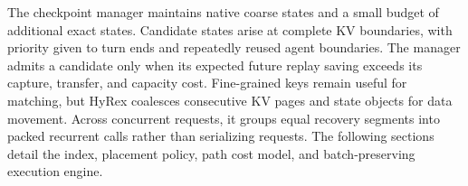\documentclass[sigconf,anonymous,review]{acmart}
\begin{document}
The checkpoint manager maintains native coarse states and a small budget of
additional exact states.  Candidate states arise at complete KV boundaries,
with priority given to turn ends and repeatedly reused agent boundaries.  The
manager admits a candidate only when its expected future replay saving exceeds
its capture, transfer, and capacity cost.  Fine-grained keys remain useful for
matching, but HyRex coalesces consecutive KV pages and state objects for data
movement.  Across concurrent requests, it groups equal recovery segments into
packed recurrent calls rather than serializing requests.  The following
sections detail the index, placement policy, path cost model, and
batch-preserving execution engine.



\end{document}
